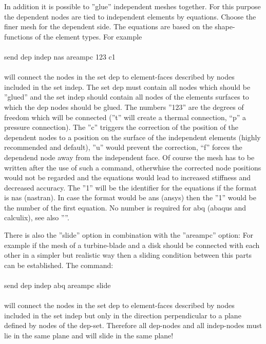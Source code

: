 \documentclass{article}
\begin{document}
In addition it is possible to ''glue'' independent meshes together. For this purpose the dependent nodes are tied to independent elements by equations. Choose the finer mesh for the dependent side. The equations are based on the shape-functions of the element types. For example\\\\send dep indep nas areampc 123 c1\\\\will connect the nodes in the set dep to element-faces described by nodes included in the set indep. The set dep must contain all nodes which should be ''glued'' and the set indep should contain all nodes of the elements surfaces to which the dep nodes should be glued. The numbers ''123'' are the degrees of freedom which will be connected (''t'' will create a thermal connection, ``p'' a pressure connection). The ''c'' triggers the correction of the position of the dependent nodes to a position on the surface of the independent elements (highly recommended and default), ''u'' would prevent the correction, ``f'' forces the dependend node away from the independent face. Of course the mesh has to be written after the use of such a command, otherwhise the corrected node positions would not be regarded and the equations would lead to increased stiffness and decreased accuracy. The ''1'' will be the identifier for the equations if the format is nas (nastran). In case the format would be ans (ansys) then the ''1'' would be the number of the first equation. No number is required for abq (abaqus and calculix), see also ''''.

There is also the ''slide'' option in combination with the ''areampc'' option: For example if the mesh of a turbine-blade and a disk should be connected with each other in a simpler but realistic way then a sliding condition between this parts can be established. The command:\\\\send dep indep abq areampc slide\\\\will connect the nodes in the set dep to element-faces described by nodes included in the set indep but only in the direction perpendicular to a plane defined by nodes of the dep-set. Therefore all dep-nodes and all indep-nodes must lie in the same plane and will slide in the same plane!\\
\end{document}
